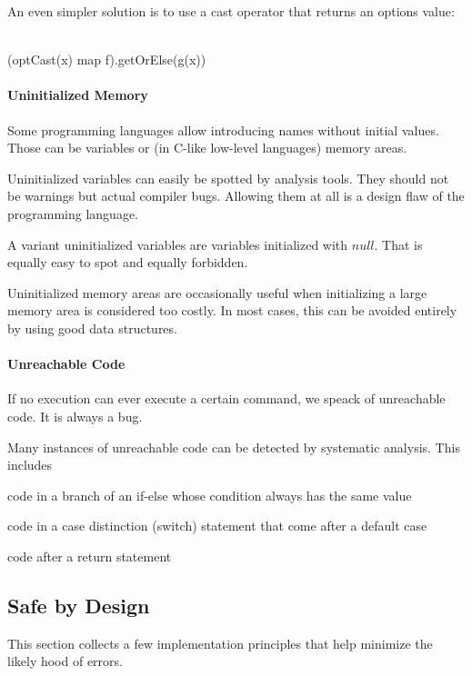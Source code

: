 An even simpler solution is to use a cast operator that returns an options value:
\begin{acode}
\\
(optCast(x)\; map\; f).getOrElse(g(x))
\end{acode}

\paragraph{Uninitialized Memory}
Some programming languages allow introducing names without initial values.
Those can be variables or (in C-like low-level languages) memory areas.

Uninitialized variables can easily be spotted by analysis tools.
They should not be warnings but actual compiler bugs.
Allowing them at all is a design flaw of the programming language.

A variant uninitialized variables are variables initialized with $null$.
That is equally easy to spot and equally forbidden.

Uninitialized memory areas are occasionally useful when initializing a large memory area is considered too costly.
In most cases, this can be avoided entirely by using good data structures.

\paragraph{Unreachable Code}
If no execution can ever execute a certain command, we speack of unreachable code.
It is always a bug.

Many instances of unreachable code can be detected by systematic analysis.
This includes
\begin{compactitem}
  \item code in a branch of an if-else whose condition always has the same value
  \item code in a case distinction (switch) statement that come after a default case
  \item code after a return statement
\end{compactitem}

\subsection{Safe by Design}

This section collects a few implementation principles that help minimize the likely hood of errors.

